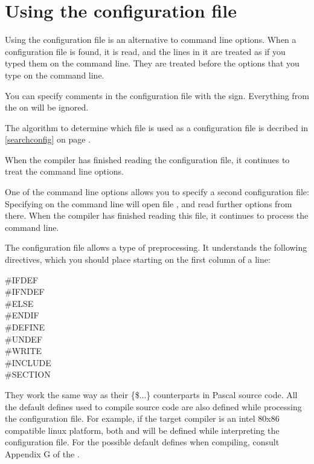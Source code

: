 \section{Using the configuration file}
\label{se:configfile}
Using the configuration file  is an alternative to command
line options. When a configuration file is found, it is read, and the lines
in it are treated as if you typed them on the command line. They are treated
before the options that you type on the command line.

You can specify comments in the configuration file with the \var{\#} sign.
Everything from the \var{\#} on will be ignored.

The algorithm to determine which file is used as a configuration file
is decribed in \ref{searchconfig} on page \pageref{searchconfig}.

When the compiler has finished reading the configuration file, it continues
to treat the command line options. 

One of the command line options allows you to specify a second configuration
file: Specifying  on the command line will open file ,
and read further options from there. When the compiler has finished reading
this file, it continues to process the command line.

The configuration file allows a type of preprocessing. It understands the
following directives, which you should place starting on the first column of a line:
\begin{description}
\item [\#IFDEF]
\item [\#IFNDEF]
\item [\#ELSE]
\item [\#ENDIF]
\item [\#DEFINE]
\item [\#UNDEF]
\item [\#WRITE]
\item [\#INCLUDE]
\item [\#SECTION]
\end{description}
They work the same way as their \{\$...\}  counterparts in Pascal source code. 
All the default defines used to compile source code are also defined while 
processing the configuration file. For example, if the target compiler is an 
intel 80x86 compatible linux platform, both  and  will be 
defined while interpreting the configuration file. For the possible default 
defines when compiling, consult Appendix G of the \progref.


